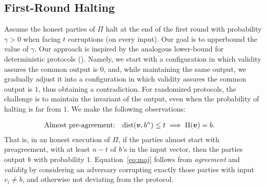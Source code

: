 \subsection{First-Round Halting}\label{sec:technique:1}
Assume the honest parties of $\Pi$ halt at the end of the first round with probability $\gamma>0$ when facing $t$ corruptions (on every input).
Our goal is to upperbound the value of $\gamma$. Our approach is inspired by the analogous lower-bound for deterministic protocols (\cf \cite{FL82,DS83}). Namely, we start with a configuration in which validity assures the common output is $0$, and, while maintaining the same output, we gradually adjust it into a configuration in which validity assures the common output is $1$, thus obtaining a contradiction. For randomized protocols, the challenge is to maintain the invariant of the output, even when the probability of halting is far from $1$. We make the following observations:

\begin{align} \label{eq:maj}
&\text{Almost pre-agreement:} \quad \mathrm{dist}({ \boldsymbol{v}},b^n) \le t \implies \Pi({ \boldsymbol{v}})=b.
\end{align}
That is, in an honest execution of $\Pi$, if the parties almost start with preagreement, \ie with at least $n-t$ of $b$'s in the input vector,
then the parties output $b$ with probability $1$. Equation~\ref{eq:maj} follows from \emph{agreement} and \emph{validity} by considering an adversary corrupting exactly those parties with input $v_i\neq b$, and otherwise not deviating from the protocol.



